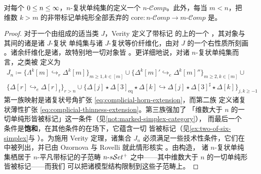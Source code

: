 \begin{proposition}\label{prop:n-complicial-cosmos}
对每个 $0\le n\le\infty$，$n$-复状单纯集的\trCategory{}定义一个\trCartesianClosed{}%
\trInfinityCosmos{} $n\text{-}\mathcal{C}omp$。此外，每当 $m<n$，把维数
$k>m$ 的非带标记单纯形全部丢弃的\trFunctor{}
$\mathrm{core}\colon n\text{-}\mathcal{C}omp\to m\text{-}\mathcal{C}omp$
是\trCosmological。
\end{proposition}
\begin{proof}
对于一个由\trMonomorphism{}组成的适当类 $J$，Verity 定义了带标记%
\trSimplicialSet{}的\trCategory{}上的一个\trCartesianClosed{}%
\trModelStructure，其\trFibrant{}对象与其间的诸\trFibration{}是诸 $J$-复状
单纯集与诸 $J$-复状等价纤维化，由对 $J$ 的一个右\trLifting{}性质所刻画
\cite[\S9.3]{bib129}。诸余纤维化是诸\trMonomorphism，故特别地一切对象皆%
\trCofibrant。更详细地说，对诸 $n$-复状单纯集而言，\trMonomorphism{}之类被
定义为
\begin{gather*}
J_{n}\coloneqq\{\Lambda^{k}[m]\hookrightarrow_{r}\Delta^{k}[m]\}_{m\ge1,k\in[m]}
\cup\{\Delta^{k}[m]'\hookrightarrow_{e}\Delta^{k}[m]''\}_{m\ge2,k\in[m]}
\cup{}\\
\{\Delta[r]\hookrightarrow_{e}\Delta[r]_{t}\}_{r>n}\cup
\{\Delta[j]\star\Delta[3]_{\mathrm{eq}}\star\Delta[k]\hookrightarrow
\Delta[j]\star\Delta[3]^{\sharp}\star\Delta[k]\}_{j,k\ge-1}
\end{gather*}
第一族映射是诸复状号角扩张 \eqref{eq:complicial-horn-extension}，而第二族
定义诸复状薄性扩张 \eqref{eq:complicial-thinness-extension}。第三族强加了
「维数大于 $n$ 的一切单纯形皆被标记」这一条件（见\cref{not:marked-simplex-category}），
而最后一个条件是\textbf{饱和}，在其他条件的在场下，它蕴含一切\trEquivalence{}%
皆被标记（见\cref{ex:two-of-six-simplex}与 \cite{bib105}）。为施用 Verity
定理，诸集合 $J_{n}$ 必须满足一些技术性条件，它们在 \cite[91--92]{bib129}
中被列出，并已由 Ozornova 与 Rovelli 就此情形核实 \cite[1.26]{bib89}。由构造，
诸 $n$-复状单纯集栖居于 $n$-平凡带标记\trSimplicialSet{}的子范畴
$n\text{-}s\mathcal{S}et^{+}$ 之中——其中维数大于 $n$ 的一切单纯形皆被标记——而我们
可以把诸\trCartesianClosed{}模型结构限制到这些子范畴上。


\end{proof}
